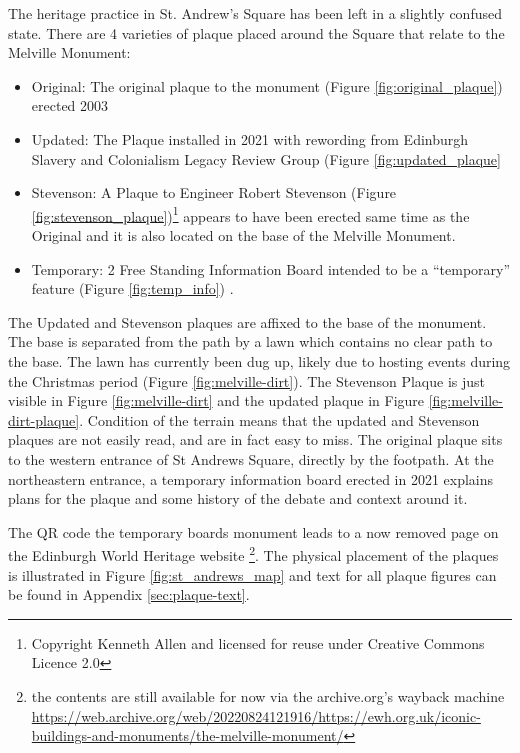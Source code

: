 \documentclass{scrartcl}
\renewcommand{\cite}{\parencite}
\begin{document}
The heritage practice in St. Andrew's Square has been left in a slightly confused state.
There are 4 varieties of plaque placed around the Square that relate to the Melville Monument:

\begin{itemize}
    \item Original: The original plaque to the monument (Figure \ref{fig:original_plaque}) erected 2003 \cite[][]{godard_2018}
    \item Updated: The Plaque installed in 2021 with rewording from Edinburgh Slavery and Colonialism Legacy Review Group (Figure \ref{fig:updated_plaque}
    \item Stevenson: A Plaque to Engineer Robert Stevenson (Figure \ref{fig:stevenson_plaque})\footnote{Copyright Kenneth Allen and licensed for reuse under Creative Commons Licence 2.0} appears to have been erected same time as the Original and it is also located on the base of the Melville Monument.
    \item Temporary: 2 Free Standing Information Board intended to be a ``temporary'' \cite[][]{council_2020} feature (Figure \ref{fig:temp_info}) . 
\end{itemize}

The Updated and Stevenson plaques are affixed to the base of the monument. The base is separated from the path by a lawn which contains no clear path to the base. The lawn has currently been dug up, likely due to hosting events during the Christmas period (Figure \ref{fig:melville-dirt}). The Stevenson Plaque is just visible in Figure \ref{fig:melville-dirt} and the updated plaque in Figure \ref{fig:melville-dirt-plaque}. Condition of the terrain means that the updated and Stevenson plaques are not easily read, and are in fact easy to miss. The original plaque sits to the western entrance of St Andrews Square, directly by the footpath. At the northeastern entrance, a temporary information board erected in 2021 explains plans for the plaque and some history of the debate and context around it.

The QR code the temporary boards monument leads to a now removed page on the Edinburgh World Heritage website \footnote{the contents are still available for now via the archive.org's wayback machine \url{https://web.archive.org/web/20220824121916/https://ewh.org.uk/iconic-buildings-and-monuments/the-melville-monument/}}. The physical placement of the plaques is illustrated in Figure \ref{fig:st_andrews_map} and text for all plaque figures can be found in Appendix \ref{sec:plaque-text}.
\end{document}

